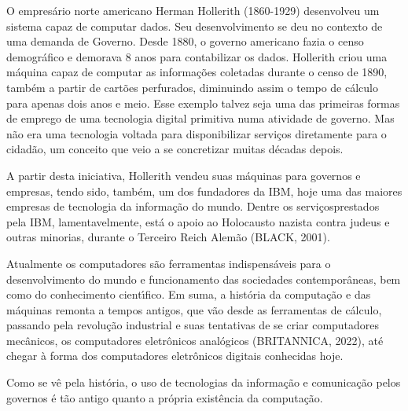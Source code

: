\documentclass[
12pt,		%
openright,	%
twoside,  %
a4paper,			%
chapter=TITLE,		%
english,			%
french,				%
spanish,			%
brazil				%
]{USPSC-classe/USPSC}
\begin{document}
O empres\'ario norte americano Herman Hollerith (1860-1929) desenvolveu um sistema capaz de computar dados. Seu desenvolvimento se deu no contexto de uma demanda de Governo. Desde 1880, o governo americano fazia o censo demogr\'afico e demorava 8 anos para contabilizar os dados. Hollerith criou uma m\'aquina capaz de computar as informa\c{c}\~oes coletadas durante o censo de 1890, tamb\'em a partir de cart\~oes perfurados, diminuindo assim o tempo de c\'alculo para apenas dois anos e meio. Esse exemplo talvez seja uma das primeiras formas de emprego de uma tecnologia digital primitiva numa atividade de governo. Mas n\~ao era uma tecnologia voltada para disponibilizar servi\c{c}os diretamente para o cidad\~ao, um conceito que veio a se concretizar muitas d\'ecadas depois.










A partir desta iniciativa, Hollerith vendeu suas m\'aquinas para governos e empresas, tendo sido, tamb\'em, um dos fundadores da IBM, hoje uma das maiores empresas de tecnologia da informa\c{c}\~ao do mundo. Dentre os \textquotedbl servi\c{c}os\textquotedbl  prestados pela IBM, lamentavelmente, est\'a o apoio ao Holocausto nazista contra judeus e outras minorias, durante o Terceiro Reich Alem\~ao  (BLACK, 2001).










Atualmente os computadores s\~ao ferramentas indispens\'aveis para o desenvolvimento do mundo e funcionamento das sociedades contempor\^aneas, bem como do conhecimento cient\'{\i}fico. Em suma, a hist\'oria da computa\c{c}\~ao e das m\'aquinas remonta a tempos antigos, que v\~ao desde as ferramentas de c\'alculo, passando pela revolu\c{c}\~ao industrial e suas tentativas de se criar computadores mec\^anicos, os computadores eletr\^onicos anal\'ogicos  (BRITANNICA, 2022), at\'e chegar \`a forma dos computadores eletr\^onicos digitais conhecidas hoje.










Como se v\^e pela hist\'oria, o uso de tecnologias da informa\c{c}\~ao e comunica\c{c}\~ao pelos governos \'e t\~ao antigo quanto a pr\'opria exist\^encia da computa\c{c}\~ao.
\end{document}

